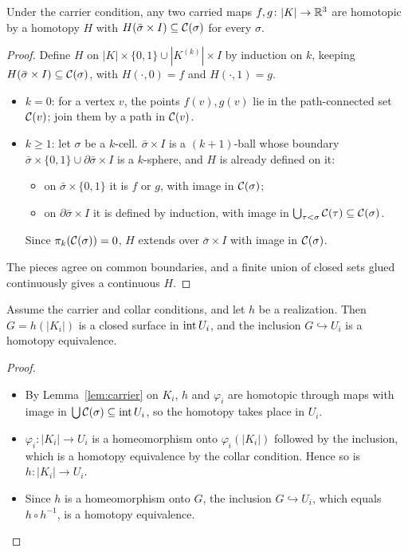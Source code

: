 \begin{lemma}\label{lem:carrier}
Under the carrier condition, any two carried maps $f,g\colon|K|\to\mathbb{R}^3$ are homotopic by a homotopy $H$ with
$H(\bar\sigma\times I)\subseteq\mathcal{C}(\sigma)$ for every $\sigma$.
\end{lemma}
\begin{proof}
Define $H$ on $|K|\times\{0,1\}\cup|K^{(k)}|\times I$ by induction on $k$, keeping $H(\bar\sigma\times I)
\subseteq\mathcal{C}(\sigma)$, with $H(\cdot,0)=f$ and $H(\cdot,1)=g$.
\begin{itemize}
\item $k=0$: for a vertex $v$, the points $f(v),g(v)$ lie in the path-connected set $\mathcal{C}(v)$; join them by a
path in $\mathcal{C}(v)$.
\item $k\ge1$: let $\sigma$ be a $k$-cell. $\bar\sigma\times I$ is a $(k+1)$-ball whose boundary
$\bar\sigma\times\{0,1\}\cup\partial\bar\sigma\times I$ is a $k$-sphere, and $H$ is already defined on it:
  \begin{itemize}
  \item on $\bar\sigma\times\{0,1\}$ it is $f$ or $g$, with image in $\mathcal{C}(\sigma)$;
  \item on $\partial\bar\sigma\times I$ it is defined by induction, with image in
  $\bigcup_{\tau<\sigma}\mathcal{C}(\tau)\subseteq\mathcal{C}(\sigma)$.
  \end{itemize}
  Since $\pi_k(\mathcal{C}(\sigma))=0$, $H$ extends over $\bar\sigma\times I$ with image in $\mathcal{C}(\sigma)$.
\end{itemize}
The pieces agree on common boundaries, and a finite union of closed sets glued continuously gives a continuous
$H$.
\end{proof}

\begin{lemma}[Separation]\label{lem:separation}
Assume the carrier and collar conditions, and let $h$ be a realization. Then $G=h(|K_i|)$ is a closed surface in
$\operatorname{int} U_i$, and the inclusion $G\hookrightarrow U_i$ is a homotopy equivalence.
\end{lemma}
\begin{proof}
\begin{itemize}
\item By Lemma~\ref{lem:carrier} on $K_i$, $h$ and $\varphi_i$ are homotopic through maps with image in
$\bigcup\mathcal{C}(\sigma)\subseteq\operatorname{int} U_i$, so the homotopy takes place in $U_i$.
\item $\varphi_i\colon|K_i|\to U_i$ is a homeomorphism onto $\varphi_i(|K_i|)$ followed by the inclusion, which is a
homotopy equivalence by the collar condition. Hence so is $h\colon|K_i|\to U_i$.
\item Since $h$ is a homeomorphism onto $G$, the inclusion $G\hookrightarrow U_i$, which equals $h\circ h^{-1}$,
is a homotopy equivalence.
\end{itemize}
\end{proof}

